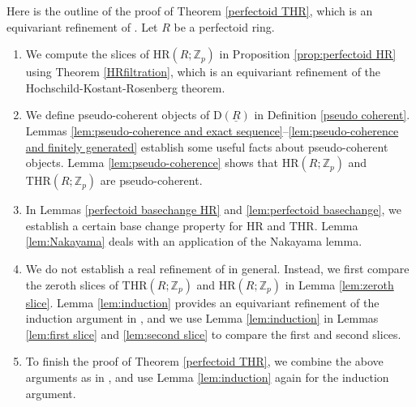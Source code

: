 \documentclass[10pt]{amsart}
\theoremstyle{definition}
\numberwithin{equation}{section}
\newcommand{\Z}{\mathbb{Z}}
\newcommand{\rD}{\mathrm{D}}
\newcommand{\ul}{\underline}
\newcommand{\HR}{\mathrm{HR}}
\newcommand{\THR}{\mathrm{THR}}
\begin{document}
Here is the outline of the proof of Theorem \ref{perfectoid THR},
which is an equivariant refinement of \cite[Theorem 6.1]{BMS19}.
Let $R$ be a perfectoid ring.
\begin{enumerate}
\item[(1)]
We compute the slices of $\HR(R;\Z_p)$ in Proposition \ref{prop:perfectoid HR} using Theorem \ref{HRfiltration}, which is an equivariant refinement of the Hochschild-Kostant-Rosenberg theorem.
\item[(2)]
We define pseudo-coherent objects of $\rD(\ul{R})$ in Definition \ref{pseudo coherent}.
Lemmas \ref{lem:pseudo-coherence and exact sequence}--\ref{lem:pseudo-coherence and finitely generated} establish some useful facts about pseudo-coherent objects.
Lemma \ref{lem:pseudo-coherence} shows that $\HR(R;\Z_p)$ and $\THR(R;\Z_p)$ are pseudo-coherent.
\item[(3)]
In Lemmas \ref{perfectoid basechange HR} and \ref{lem:perfectoid basechange}, we establish a certain base change property for $\HR$ and $\THR$.
Lemma \ref{lem:Nakayama} deals with an application of the Nakayama lemma.
\item[(4)]
We do not establish a real refinement of \cite[Proposition IV.4.2]{NS} in general.
Instead,
we first compare the zeroth slices of $\THR(R;\Z_p)$ and $\HR(R;\Z_p)$ in Lemma \ref{lem:zeroth slice}.
Lemma \ref{lem:induction} provides an equivariant refinement of the induction argument in \cite[proof of Theorem 6.1]{BMS19},
and we use Lemma \ref{lem:induction} in Lemmas \ref{lem:first slice} and \ref{lem:second slice} to compare the first and second slices.
\item[(5)]
To finish the proof of Theorem \ref{perfectoid THR},
we combine the above arguments as in \cite[proof of Theorem 6.1]{BMS19},
and use Lemma \ref{lem:induction} again for the induction argument.
\end{enumerate}
\end{document}
